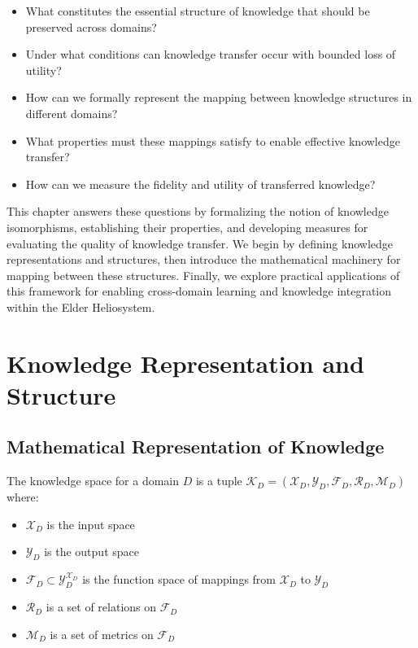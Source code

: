 \begin{itemize}
    \item What constitutes the essential structure of knowledge that should be preserved across domains?
    \item Under what conditions can knowledge transfer occur with bounded loss of utility?
    \item How can we formally represent the mapping between knowledge structures in different domains?
    \item What properties must these mappings satisfy to enable effective knowledge transfer?
    \item How can we measure the fidelity and utility of transferred knowledge?
\end{itemize}

This chapter answers these questions by formalizing the notion of knowledge isomorphisms, establishing their properties, and developing measures for evaluating the quality of knowledge transfer. We begin by defining knowledge representations and structures, then introduce the mathematical machinery for mapping between these structures. Finally, we explore practical applications of this framework for enabling cross-domain learning and knowledge integration within the Elder Heliosystem.

\section{Knowledge Representation and Structure}

\subsection{Mathematical Representation of Knowledge}

\begin{definition}
The knowledge space for a domain $D$ is a tuple $\mathcal{K}_D = (\mathcal{X}_D, \mathcal{Y}_D, \mathcal{F}_D, \mathcal{R}_D, \mathcal{M}_D)$ where:
\begin{itemize}
    \item $\mathcal{X}_D$ is the input space
    \item $\mathcal{Y}_D$ is the output space
    \item $\mathcal{F}_D \subset \mathcal{Y}_D^{\mathcal{X}_D}$ is the function space of mappings from $\mathcal{X}_D$ to $\mathcal{Y}_D$
    \item $\mathcal{R}_D$ is a set of relations on $\mathcal{F}_D$
    \item $\mathcal{M}_D$ is a set of metrics on $\mathcal{F}_D$
\end{itemize}
\end{definition}

